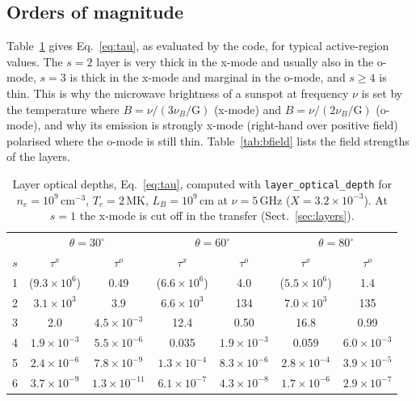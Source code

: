 \documentclass[11pt,a4paper]{article}
\newcommand{\code}[1]{\texttt{#1}}
\newcommand{\nuB}{\nu_B}
\begin{document}
\subsection{Orders of magnitude}
Table~\ref{tab:tau} gives Eq.~\eqref{eq:tau}, as evaluated by the code, for typical
active-region values. The $s=2$ layer is very thick in the x-mode and usually also in the
o-mode, $s=3$ is thick in the x-mode and marginal in the o-mode, and $s\ge4$ is thin. This is
why the microwave brightness of a sunspot at frequency $\nu$ is set by the temperature where
$B=\nu/(3\nuB/\text{G})$ (x-mode) and $B=\nu/(2\nuB/\text{G})$ (o-mode), and why its
emission is strongly x-mode (right-hand over positive field) polarised where the o-mode is
still thin. Table~\ref{tab:bfield} lists the field strengths of the layers.

\begin{table}[ht]
\centering\small
\caption{Layer optical depths, Eq.~\eqref{eq:tau}, computed with
\code{layer\_optical\_depth} for $n_e=10^9$\,cm$^{-3}$, $T_e=2$\,MK, $L_B=10^9$\,cm at
$\nu=5$\,GHz ($X=3.2\times10^{-3}$). At $s=1$ the x-mode is cut off in the transfer
(Sect.~\ref{sec:layers}).}
\label{tab:tau}
\begin{tabular}{@{}c cc cc cc@{}}
\toprule
 & \multicolumn{2}{c}{$\theta=30^\circ$} & \multicolumn{2}{c}{$\theta=60^\circ$} & \multicolumn{2}{c}{$\theta=80^\circ$} \\
\cmidrule(lr){2-3}\cmidrule(lr){4-5}\cmidrule(lr){6-7}
$s$ & $\tau^x$ & $\tau^o$ & $\tau^x$ & $\tau^o$ & $\tau^x$ & $\tau^o$ \\
\midrule
1 & ($9.3\times10^{6}$) & 0.49 & ($6.6\times10^{6}$) & 4.0 & ($5.5\times10^{6}$) & 1.4 \\
2 & $3.1\times10^{3}$ & 3.9 & $6.6\times10^{3}$ & 134 & $7.0\times10^{3}$ & 135 \\
3 & 2.0 & $4.5\times10^{-3}$ & 12.4 & 0.50 & 16.8 & 0.99 \\
4 & $1.9\times10^{-3}$ & $5.5\times10^{-6}$ & 0.035 & $1.9\times10^{-3}$ & 0.059 & $6.0\times10^{-3}$ \\
5 & $2.4\times10^{-6}$ & $7.8\times10^{-9}$ & $1.3\times10^{-4}$ & $8.3\times10^{-6}$ & $2.8\times10^{-4}$ & $3.9\times10^{-5}$ \\
6 & $3.7\times10^{-9}$ & $1.3\times10^{-11}$ & $6.1\times10^{-7}$ & $4.3\times10^{-8}$ & $1.7\times10^{-6}$ & $2.9\times10^{-7}$ \\
\bottomrule
\end{tabular}
\end{table}
\end{document}
